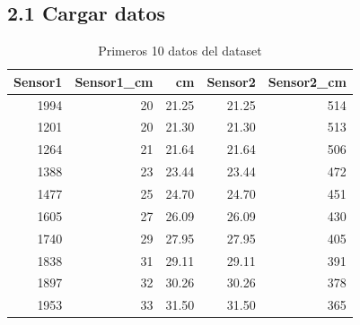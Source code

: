 \documentclass[
]{article}
\newenvironment{Shaded}{\begin{snugshade}}{\end{snugshade}}
\newcommand{\AttributeTok}[1]{\textcolor[rgb]{0.77,0.63,0.00}{#1}}
\newcommand{\CommentTok}[1]{\textcolor[rgb]{0.56,0.35,0.01}{\textit{#1}}}
\newcommand{\ConstantTok}[1]{\textcolor[rgb]{0.00,0.00,0.00}{#1}}
\newcommand{\DecValTok}[1]{\textcolor[rgb]{0.00,0.00,0.81}{#1}}
\newcommand{\FunctionTok}[1]{\textcolor[rgb]{0.00,0.00,0.00}{#1}}
\newcommand{\NormalTok}[1]{#1}
\newcommand{\OtherTok}[1]{\textcolor[rgb]{0.56,0.35,0.01}{#1}}
\newcommand{\SpecialCharTok}[1]{\textcolor[rgb]{0.00,0.00,0.00}{#1}}
\newcommand{\StringTok}[1]{\textcolor[rgb]{0.31,0.60,0.02}{#1}}
\begin{document}
\hypertarget{cargar-datos}{%
\subsection{2.1 Cargar datos}\label{cargar-datos}}

\begin{Shaded}
\end{Shaded}

\begin{table}

\caption{\label{tab:unnamed-chunk-2}Primeros 10 datos del dataset}
\centering
\begin{tabular}[t]{r|r|r|r|r}
\hline
Sensor1 & Sensor1\_cm & cm & Sensor2 & Sensor2\_cm\\
\hline
1994 & 20 & 21.25 & 21.25 & 514\\
\hline
1201 & 20 & 21.30 & 21.30 & 513\\
\hline
1264 & 21 & 21.64 & 21.64 & 506\\
\hline
1388 & 23 & 23.44 & 23.44 & 472\\
\hline
1477 & 25 & 24.70 & 24.70 & 451\\
\hline
1605 & 27 & 26.09 & 26.09 & 430\\
\hline
1740 & 29 & 27.95 & 27.95 & 405\\
\hline
1838 & 31 & 29.11 & 29.11 & 391\\
\hline
1897 & 32 & 30.26 & 30.26 & 378\\
\hline
1953 & 33 & 31.50 & 31.50 & 365\\
\hline
\end{tabular}
\end{table}
\end{document}
